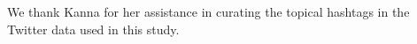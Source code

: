 We thank Kanna for her assistance in curating the topical hashtags in the Twitter data used in this study.